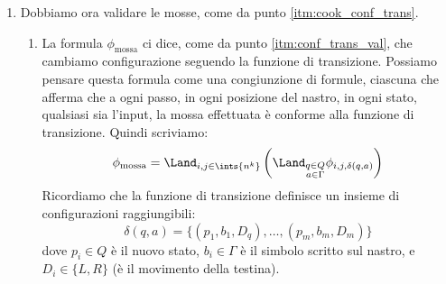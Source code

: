\begin{enumerate}
\begin{enumerate}
			\[
				\phi_{\text{nastro}} = \Land_{i, j \in \ints{n^k}} \phi_{\text{nastro},i,j}
			\]
			Ogni formula $\phi_{\text{nastro},i,j}$ \`e:
			\[
				\phi_{\text{nastro},i,j} = \left( \Lor_{a \in \Gamma} T_{i,j,a} \right) \land
				\left( \Land_{\{a_1,a_2\} \in \binom{\Gamma}{2}} \overline{\left( T_{i,j,a_1} \land T_{i,j,a_2} \right)} \right)
			\]
			Come sopra, la prima parte afferma che al passo $i$, alla posizione $j$, c'\`e almeno un simbolo sul nastro.
			La seconda parte afferma che non ci sono due o pi\`u simboli sulla posizione $j$ del nastro, al passo $i$ di computazione.
			\item $\phi_{\text{stato}}$ ci dice che a ogni passo la macchina si trova in uno ed un solo stato, come da punto \ref{itm:cook_conf_val_stato}.
			La formula \`e del tutto simile alle precedenti:
			\[
				\phi_{\text{stato}} = \Land_{i \in \ints{n^k}} \phi_{\text{stato},i}
			\]
			dove ogni formula $\phi_{\text{stato},i}$ \`e anche qui:
			\[
				\phi_{\text{stato},i} = \left( \Lor_{q \in Q} S_{i,q} \right) \land
				\left( \Land_{\{q_1,q_2\} \in \binom{Q}{2}} \overline{\left( S_{i,q_1} \land S_{i,q_2} \right)} \right)
			\]
			Di nuovo, la prima parte afferma che la macchina al passo $i$ si trova in almeno uno stato.
			La seconda parte afferma che la macchina \emph{non} si trova in due o pi\`u stati al passo $i$.
		\end{enumerate}
	Questo conclude il punto \ref{itm:cook_conf_val}: se $\phi$ \`e vera, ogni configurazione che rappresenta \`e valida.
	\item Dobbiamo ora validare le mosse, come da punto \ref{itm:cook_conf_trans}.
		\begin{enumerate}
			\item La formula $\phi_{\text{mossa}}$ ci dice, come da punto \ref{itm:conf_trans_val}, che cambiamo configurazione seguendo la funzione di transizione.
			Possiamo pensare questa formula come una congiunzione di formule, ciascuna che afferma che a ogni passo, in ogni posizione del nastro, in ogni stato, qualsiasi sia l'input, la mossa effettuata \`e conforme alla funzione di transizione.
			Quindi scriviamo:
			\[
				\phi_{\text{mossa}} = \Land_{i,j \in \ints{n^k}} \left( \Land_{\substack{q \in Q \\ a \in \Gamma}} \phi_{i,j,\delta(q,a)} \right)
			\]
			Ricordiamo che la funzione di transizione definisce un insieme di configurazioni raggiungibili:
			\[
				\delta(q,a) = \{ (p_1, b_1, D_q), \dots, (p_m, b_m, D_m) \}
			\]
			dove $p_i \in Q$ \`e il nuovo stato, $b_i \in \Gamma$ \`e il simbolo scritto sul nastro, e $D_i \in \{L, R\}$ (\`e il movimento della testina).

\end{enumerate}
\end{enumerate}
